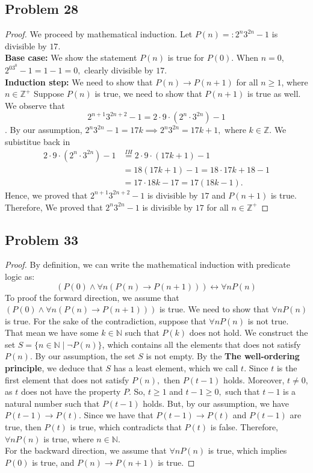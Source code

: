 \documentclass[a4paper,12pt]{article}
\begin{document}
\subsection*{Problem 28}
\begin{proof}
  We proceed by mathematical induction. Let $P(n)=: 2^n3^{2n}-1$ is divisible by $17.$\\
\textbf{Base case:} We show the statement $P(n)$ is true for $P(0).$ When $n=0$, $2^03^0-1=1-1=0,$ clearly divisible by $17$.\\
\textbf{Induction step:} We need to show that $P(n) \to P(n+1)$ for all $n\geq 1$, where $n \in \mathbb{Z^+}$ Suppose $P(n)$ is true, we need to show that $P(n+1)$ is true as well. We observe that \[2^{n+1}3^{2n+2}-1=2\cdot 9\cdot (2^n\cdot 3^{2n})-1\]. By our assumption, $2^n3^{2n}-1=17k \implies 2^n3^{2n}=17k+1,$ where $k \in \mathbb{Z}.$ We subistitue back in
\begin{align*}
    2\cdot 9\cdot (2^n\cdot 3^{2n})-1 &\overset{IH}{=} 2\cdot 9\cdot (17k+1)-1\\
    &= 18(17k+1)-1=18\cdot 17 k+ 18-1\\
    &=17 \cdot 18 k -17=17(18k-1).
\end{align*}
Hence, we proved that $2^{n+1}3^{2n+2}-1$ is divisible by $17$ and $P(n+1)$ is true. Therefore, We proved that $2^n3^{2n}-1$ is divisible by $17$ for all $n \in \mathbb{Z^+}$  
\end{proof}
\subsection*{Problem 33}
\begin{proof}
    By definition, we can write the mathematical induction with predicate logic as:
\[(P(0)\wedge \forall n(P(n)\to P(n+1)))\leftrightarrow \forall nP(n)\]
To proof the forward direction, we assume that $(P(0)\wedge \forall n(P(n)\to P(n+1)))$ is true. We need to show that $\forall n P(n)$ is true. For the sake of the contradiction, suppose that $\forall n P(n)$ is not true. That mean we have some $k \in \mathbb{N}$ such that $P(k)$ does not hold. We construct the set $S=\{n\in \mathbb{N}\mid \neg P(n)\}$, which contains all the elements that does not satisfy $P(n)$. By our assumption, the set $S$ is not empty.
By the \textbf{The well-ordering principle}, we deduce that $S$ has a least element, which we call $t$. Since $t$ is the first element that does not satisfy $P(n),$ then $P(t-1)$ holds. Moreover, $t \neq 0$, as $t$ does not have the property $P$. So, $t \geq 1$ and $t-1\geq 0,$ such that $t-1$ is a natural number such that $P(t-1)$ holds. But, by our assumption, we have $P(t-1) \to P(t).$ Since we have that $P(t-1) \to P(t)$ and $P(t-1)$ are true, then $P(t)$ is true, which contradicts that $P(t)$ is false. Therefore, $\forall n P(n)$ is true, where $n \in \mathbb{N}.$\\
For the backward direction, we assume that $\forall n P(n)$ is true, which implies $P(0)$ is true, and $P(n)\to P(n+1)$ is true. 
\end{proof}
\end{document}
